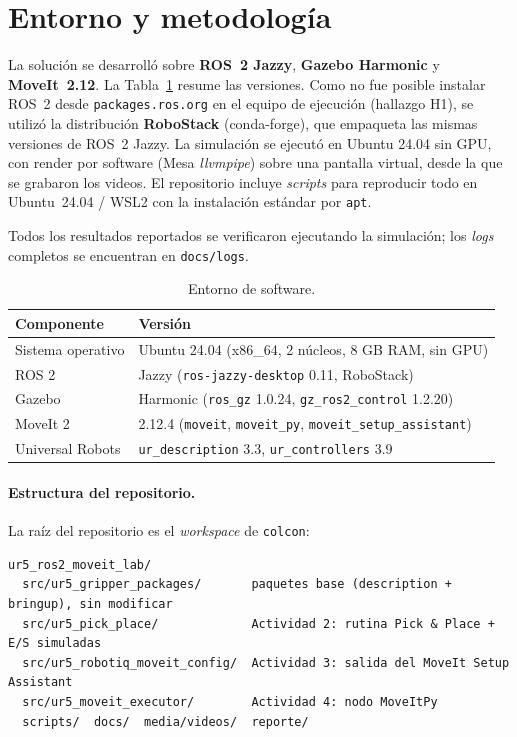 \documentclass[11pt,letterpaper]{article}
\begin{document}
\section{Entorno y metodología}

La solución se desarrolló sobre \textbf{ROS~2 Jazzy}, \textbf{Gazebo Harmonic} y \textbf{MoveIt~2.12}. La Tabla~\ref{tab:entorno} resume las versiones. Como no fue posible instalar ROS~2 desde \texttt{packages.ros.org} en el equipo de ejecución (hallazgo H1), se utilizó la distribución \textbf{RoboStack} (conda-forge), que empaqueta las mismas versiones de ROS~2 Jazzy. La simulación se ejecutó en Ubuntu 24.04 sin GPU, con render por software (Mesa \emph{llvmpipe}) sobre una pantalla virtual, desde la que se grabaron los videos. El repositorio incluye \emph{scripts} para reproducir todo en Ubuntu~24.04 / WSL2 con la instalación estándar por \texttt{apt}.

Todos los resultados reportados se verificaron ejecutando la simulación; los \emph{logs} completos se encuentran en \texttt{docs/logs}.

\begin{table}[H]
\centering
\caption{Entorno de software.}
\label{tab:entorno}
\begin{tabular}{@{}ll@{}}
\toprule
Componente & Versión \\
\midrule
Sistema operativo & Ubuntu 24.04 (x86\_64, 2 núcleos, 8 GB RAM, sin GPU) \\
ROS 2 & Jazzy (\texttt{ros-jazzy-desktop} 0.11, RoboStack) \\
Gazebo & Harmonic (\texttt{ros\_gz} 1.0.24, \texttt{gz\_ros2\_control} 1.2.20) \\
MoveIt 2 & 2.12.4 (\texttt{moveit}, \texttt{moveit\_py}, \texttt{moveit\_setup\_assistant}) \\
Universal Robots & \texttt{ur\_description} 3.3, \texttt{ur\_controllers} 3.9 \\
\bottomrule
\end{tabular}
\end{table}

\paragraph{Estructura del repositorio.} La raíz del repositorio es el \emph{workspace} de \texttt{colcon}:

\begin{lstlisting}
ur5_ros2_moveit_lab/
  src/ur5_gripper_packages/       paquetes base (description + bringup), sin modificar
  src/ur5_pick_place/             Actividad 2: rutina Pick & Place + E/S simuladas
  src/ur5_robotiq_moveit_config/  Actividad 3: salida del MoveIt Setup Assistant
  src/ur5_moveit_executor/        Actividad 4: nodo MoveItPy
  scripts/  docs/  media/videos/  reporte/
\end{lstlisting}
\end{document}
